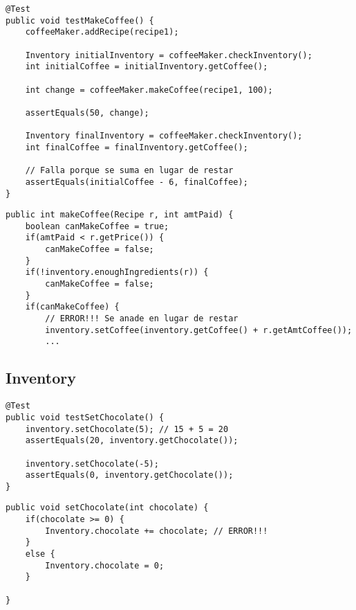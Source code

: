 \begin{paracol}{2}
\begin{lstlisting}
@Test
public void testMakeCoffee() {
    coffeeMaker.addRecipe(recipe1);
    
    Inventory initialInventory = coffeeMaker.checkInventory();
    int initialCoffee = initialInventory.getCoffee();
    
    int change = coffeeMaker.makeCoffee(recipe1, 100);
    
    assertEquals(50, change);
    
    Inventory finalInventory = coffeeMaker.checkInventory();
    int finalCoffee = finalInventory.getCoffee();
    
    // Falla porque se suma en lugar de restar
    assertEquals(initialCoffee - 6, finalCoffee); 
}
\end{lstlisting}

\switchcolumn

\begin{lstlisting}
public int makeCoffee(Recipe r, int amtPaid) {
    boolean canMakeCoffee = true;
    if(amtPaid < r.getPrice()) {
        canMakeCoffee = false;
    }
    if(!inventory.enoughIngredients(r)) {
        canMakeCoffee = false;
    }
    if(canMakeCoffee) {
        // ERROR!!! Se anade en lugar de restar
        inventory.setCoffee(inventory.getCoffee() + r.getAmtCoffee());
        ...
\end{lstlisting}
\end{paracol}

\subsection{Inventory}
\begin{paracol}{2}

    \begin{lstlisting}
@Test
public void testSetChocolate() {
    inventory.setChocolate(5); // 15 + 5 = 20
    assertEquals(20, inventory.getChocolate());
    
    inventory.setChocolate(-5);
    assertEquals(0, inventory.getChocolate());
}
    \end{lstlisting}
    
    \switchcolumn

    \begin{lstlisting}[caption={Hay un \lstinline|+=| en lugar de \lstinline|=|}]
public void setChocolate(int chocolate) {
    if(chocolate >= 0) {
        Inventory.chocolate += chocolate; // ERROR!!!
    }
    else {
        Inventory.chocolate = 0;
    }
    
}
    \end{lstlisting}
\end{paracol}

